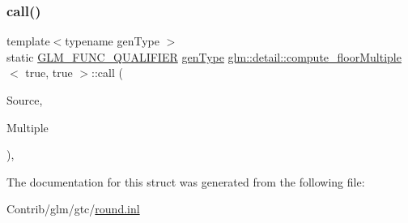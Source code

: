 \subsubsection{\texorpdfstring{call()}{call()}}
{\footnotesize\ttfamily template$<$typename gen\+Type $>$ \\
static \mbox{\hyperlink{setup_8hpp_a33fdea6f91c5f834105f7415e2a64407}{G\+L\+M\+\_\+\+F\+U\+N\+C\+\_\+\+Q\+U\+A\+L\+I\+F\+I\+ER}} \mbox{\hyperlink{structglm_1_1detail_1_1gen_type}{gen\+Type}} \mbox{\hyperlink{structglm_1_1detail_1_1compute__floor_multiple}{glm\+::detail\+::compute\+\_\+floor\+Multiple}}$<$ true, true $>$\+::call (\begin{DoxyParamCaption}\item[{\mbox{\hyperlink{structglm_1_1detail_1_1gen_type}{gen\+Type}}}]{Source,  }\item[{\mbox{\hyperlink{structglm_1_1detail_1_1gen_type}{gen\+Type}}}]{Multiple }\end{DoxyParamCaption})\hspace{0.3cm}{\ttfamily [inline]}, {\ttfamily [static]}}



The documentation for this struct was generated from the following file\+:\begin{DoxyCompactItemize}
\item 
Contrib/glm/gtc/\mbox{\hyperlink{round_8inl}{round.\+inl}}\end{DoxyCompactItemize}
